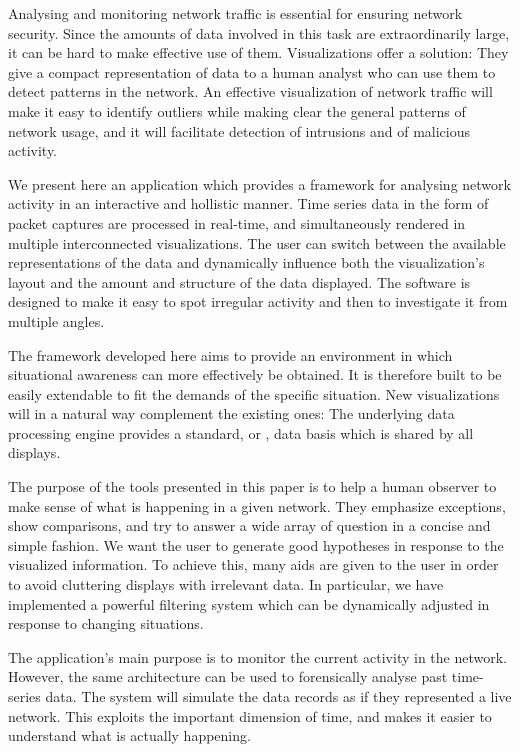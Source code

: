 Analysing and monitoring network traffic is essential for ensuring network security. Since the amounts of data involved in this task are extraordinarily large, it can be hard to make effective use of them. Visualizations offer a solution: They give a compact representation of data to a human analyst who can use them to detect patterns in the network. An effective visualization of network traffic will make it easy to identify outliers while making clear the general patterns of network usage, and it will facilitate detection of intrusions and of malicious activity. 

We present here an application which provides a framework for analysing network activity in an interactive and hollistic manner. Time series data in the form of packet captures are processed in real-time, and simultaneously rendered in multiple interconnected visualizations. The user can switch between the available representations of the data and dynamically influence both the visualization's layout and the amount and structure of the data displayed. The software is designed to make it easy to spot irregular activity and then to investigate it from multiple angles. 

The framework developed here aims to provide an environment in which situational awareness can more effectively be obtained. It is therefore built to be easily extendable to fit the demands of the specific situation. New visualizations will in a natural way complement the existing ones: The underlying data processing engine provides a standard, or , data basis which is shared by all displays.

The purpose of the tools presented in this paper is to help a human observer to make sense of what is happening in a given network. They emphasize exceptions, show comparisons, and try to answer a wide array of question in a concise and simple fashion. We want the user to generate good hypotheses in response to the visualized information. To achieve this, many aids are given to the user in order to avoid cluttering displays with irrelevant data. In particular, we have implemented a powerful filtering system which can be dynamically adjusted in response to changing situations.

The application's main purpose is to monitor the current activity in the network. However, the same architecture can be used to forensically analyse past time-series data. The system will simulate the data records as if they represented a live network. This exploits the important dimension of time, and makes it easier to understand what is actually happening.